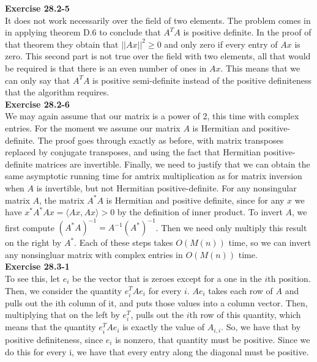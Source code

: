 \documentclass{article}
\begin{document}
\noindent\textbf{Exercise 28.2-5}\\

It does not work necessarily over the field of two elements. The problem comes in in applying theorem D.6 to conclude that $A^TA$ is positive definite. In the proof of that theorem they obtain that $||Ax||^2 \ge 0$ and only zero if every entry of $Ax$ is zero. This second part is not true over the field with two elements, all that would be required is that there is an even number of ones in $Ax$. This means that we can only say that $A^TA$ is positive semi-definite instead of the positive definiteness that the algorithm requires.\\

\noindent\textbf{Exercise 28.2-6}\\

We may again assume that our matrix is a power of 2, this time with complex entries. For the moment we assume our matrix $A$ is Hermitian and positive-definite. The proof goes through exactly as before, with matrix transposes replaced by conjugate transposes, and using the fact that Hermitian positive-definite matrices are invertible.  Finally, we need to justify that we can obtain the same asymptotic running time for amtrix multiplication as for matrix inversion when $A$ is invertible, but not Hermitian positive-definite. For any nonsingular matrix $A$, the matrix $A^*A$ is Hermitian and positive definite, since for any $x$ we have $x^*A^*Ax = \langle Ax, Ax \rangle > 0$ by the definition of inner product. To invert $A$, we first compute $(A^*A)^{-1} = A^{-1} (A^*)^{-1}$.  Then we need only multiply this result on the right by $A^*$. Each of these steps takes $O(M(n))$ time, so we can invert any nonsingluar matrix with complex entries in $O(M(n))$ time. \\

\noindent\textbf{Exercise 28.3-1}\\

To see this, let $e_i$ be the vector that is zeroes except for a one in the $i$th position. Then, we consider the quantity $e_i^TAe_i$ for every $i$. $Ae_i$ takes each row of $A$ and pulls out the ith column of it, and puts those values into a column vector. Then, multiplying that on the left by $e_i^T$, pulls out the $i$th row of this quantity, which means that the quantity $e_i^TAe_i$ is exactly the value of $A_{i,i}$. So, we have that by positive definiteness, since $e_i$ is nonzero, that quantity must be positive. Since we do this for every i, we have that every entry along the diagonal must be positive.\\
\end{document}
